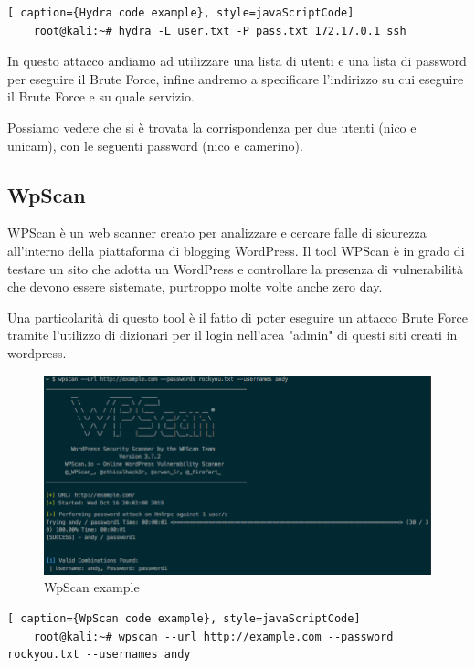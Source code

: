 \begin{lstlisting}[ caption={Hydra code example}, style=javaScriptCode]
    root@kali:~# hydra -L user.txt -P pass.txt 172.17.0.1 ssh
\end{lstlisting}

In questo attacco andiamo ad utilizzare una lista di utenti e una lista di password per eseguire il Brute Force, infine andremo a specificare l'indirizzo su cui eseguire il Brute Force e su quale servizio.

Possiamo vedere che si è trovata la corrispondenza per due utenti (nico e unicam), con le seguenti password (nico e camerino). 
\newpage

\subsection{WpScan}

WPScan\cite{wpscan} è un web scanner creato per analizzare e cercare falle di sicurezza all’interno della piattaforma di blogging WordPress. Il tool WPScan è in grado di testare un sito che adotta un WordPress e controllare la presenza di vulnerabilità che devono essere sistemate, purtroppo molte volte anche zero day.

Una particolarità di questo tool è il fatto di poter eseguire un attacco Brute Force tramite l'utilizzo di dizionari per il login nell'area "admin" di questi siti creati in wordpress.

\begin{figure}[htpb!]
    \centering
    \includegraphics[width=\linewidth]{Immagini/5/wpscan_example.png}
    \caption{WpScan example\cite{wpscan_example}}
    \label{fig:WpScan example}
\end{figure}

\begin{lstlisting}[ caption={WpScan code example}, style=javaScriptCode]
    root@kali:~# wpscan --url http://example.com --password rockyou.txt --usernames andy
\end{lstlisting}

